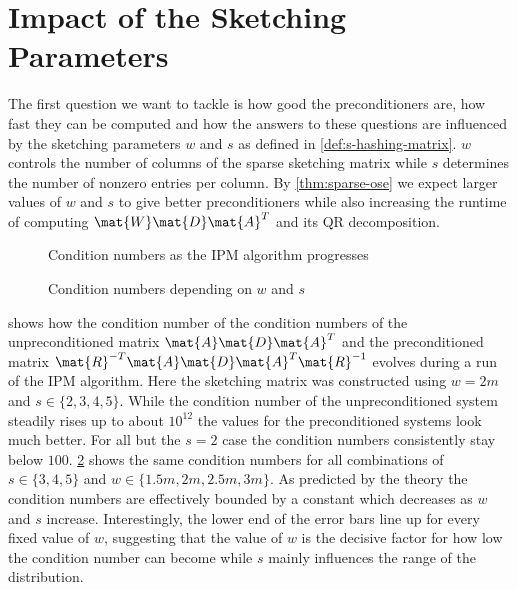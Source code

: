 \section{Impact of the Sketching Parameters}

The first question we want to tackle is how good the preconditioners are, how fast they can be computed and how the answers to these questions are influenced by the sketching parameters \(w\) and \(s\) as defined in \cref{def:s-hashing-matrix}. \(w\) controls the number of columns of the sparse sketching matrix while \(s\) determines the number of nonzero entries per column.
By \cref{thm:sparse-ose} we expect larger values of \(w\) and \(s\) to give better preconditioners while also increasing the runtime of computing \(\mat{W}\mat{D}\mat{A}^T\) and its QR decomposition.

\begin{figure}[tbp]
  \centering%
  \caption{Condition numbers as the IPM algorithm progresses}%
  \label{fig:condition_number_history}
\end{figure}

\begin{figure}[tbp]%
  \centering%
  \caption{Condition numbers depending on \(w\) and \(s\)}%
  \label{fig:condition_number}
\end{figure}%

 shows how the condition number of the condition numbers of the unpreconditioned matrix \(\mat{A}\mat{D}\mat{A}^T\) and the preconditioned matrix \(\mat{R}^{-T}\mat{A}\mat{D}\mat{A}^T\mat{R}^{-1}\) evolves during a run of the IPM algorithm.
Here the sketching matrix was constructed using \(w=2m\) and \(s \in \{2, 3, 4, 5\}\).
While the condition number of the unpreconditioned system steadily rises up to about \(10^{12}\) the values for the preconditioned systems look much better.
For all but the \(s=2\) case the condition numbers consistently stay below \(100\).
\cref{fig:condition_number} shows the same condition numbers for all combinations of \(s \in \{3,4,5\}\) and \(w \in \{1.5m, 2m, 2.5m, 3m\}\).
As predicted by the theory the condition numbers are effectively bounded by a constant which decreases as \(w\) and \(s\) increase.
Interestingly, the lower end of the error bars line up for every fixed value of \(w\), suggesting that the value of \(w\) is the decisive factor for how low the condition number can become while \(s\) mainly influences the range of the distribution.

